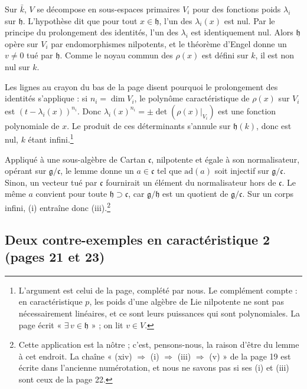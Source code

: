 \documentclass[11pt,a4paper]{article}
\begin{document}
Sur $\bar k$, $V$ se décompose en sous-espaces primaires $V_{i}$ pour des
fonctions poids $\lambda_{i}$ sur $\mathfrak{h}$. L'hypothèse dit que pour
tout $x \in \mathfrak{h}$, l'un des $\lambda_{i}(x)$ est nul. Par le principe
du prolongement des identités, l'un des $\lambda_{i}$ est identiquement nul.
Alors $\mathfrak{h}$ opère sur $V_{i}$ par endomorphismes nilpotents, et le
théorème d'Engel donne un $v \neq 0$ tué par $\mathfrak{h}$. Comme le noyau
commun des $\rho(x)$ est défini sur $k$, il est non nul sur $k$.

Les lignes au crayon du bas de la page disent pourquoi le prolongement des
identités s'applique : si $n_{i} = \dim V_{i}$, le polynôme caractéristique
de $\rho(x)$ sur $V_{i}$ est $(t - \lambda_{i}(x))^{n_{i}}$. Donc
$\lambda_{i}(x)^{n_{i}} = \pm \det(\rho(x)|_{V_{i}})$ est une fonction
polynomiale de $x$. Le produit de ces déterminants s'annule sur
$\mathfrak{h}(k)$, donc est nul, $k$ étant infini.\footnote{L'argument est
celui de la page, complété par nous. Le complément compte : en
caractéristique $p$, les poids d'une algèbre de Lie nilpotente ne sont pas
nécessairement linéaires, et ce sont leurs puissances qui sont polynomiales.
La page écrit « $\exists\, v \in \mathfrak{h}$ » ; on lit $v \in V$.}

Appliqué à une sous-algèbre de Cartan $\mathfrak{c}$, nilpotente et égale à
son normalisateur, opérant sur $\mathfrak{g}/\mathfrak{c}$, le lemme donne un
$a \in \mathfrak{c}$ tel que $\mathrm{ad}(a)$ soit injectif sur
$\mathfrak{g}/\mathfrak{c}$. Sinon, un vecteur tué par $\mathfrak{c}$
fournirait un élément du normalisateur hors de $\mathfrak{c}$. Le même $a$
convient pour toute $\mathfrak{h} \supset \mathfrak{c}$, car
$\mathfrak{g}/\mathfrak{h}$ est un quotient de $\mathfrak{g}/\mathfrak{c}$. Sur
un corps infini, (i) entraîne donc (iii).\footnote{Cette application est la
nôtre ; c'est, pensons-nous, la raison d'être du lemme à cet endroit. La
chaîne « (xiv) $\Rightarrow$ (i) $\Rightarrow$ (iii) $\Rightarrow$ (v) » de la
page 19 est écrite dans l'ancienne numérotation, et nous ne savons pas si ses
(i) et (iii) sont ceux de la page 22.}

\subsection*{Deux contre-exemples en caractéristique 2 (pages 21 et 23)}
\end{document}
